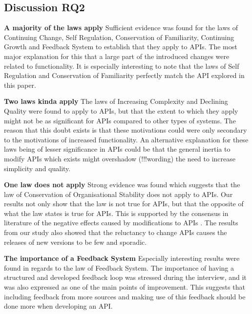 \documentclass{sig-alternate}
\begin{document}
\subsection{Discussion RQ2}

\noindent
\textbf{A majority of the laws apply  }
Sufficient evidence was found for the laws of Continuing Change, Self Regulation, Conservation of Familiarity, Continuing Growth and Feedback System to establish that they apply to APIs. The most major explanation for this that a large part of the introduced changes were related to functionality. It is especially interesting to note that the laws of Self Regulation and Conservation of Familiarity perfectly match the API explored in this paper. 

\smallskip \noindent
\textbf{Two laws kinda apply  }
The laws of Increasing Complexity and Declining Quality were found to apply to APIs, but that the extent to which they apply might not be as significant for APIs compared to other types of systems. The reason that this doubt exists is that these motivations could were only secondary to the motivations of increased functionality. An alternative explanation for these laws being of lesser significance in APIs could be that the general inertia to modify APIs which exists \cite{google_talk} \cite{mcdonnell2013empirical} \cite{robbes2012developers} \cite{henning2007api} might overshadow (!!!wording) the need to increase simplicity and quality. 


\smallskip \noindent
\textbf{One law does not apply  }
Strong evidence was found which suggests that the law of Conservation of Organisational Stability does not apply to APIs. Our results not only show that the law is not true for APIs, but that the opposite of what the law states is true for APIs. This is supported by the consensus in literature of the negative effects caused by modifications to APIs \cite{google_talk} \cite{mcdonnell2013empirical} \cite{robbes2012developers} \cite{henning2007api}. The results from our study also showed that the reluctancy to change APIs causes the releases of new versions to be few and sporadic. 


\smallskip \noindent
\textbf{The importance of a Feedback System  }
Especially interesting results were found in regards to the law of Feedback System. The importance of having a structured and developed feedback loop was stressed during the interview, and it was also expressed as one of the main points of improvement. This suggests that including feedback from more sources and making use of this feedback should be done more when developing an API. 
\end{document}
